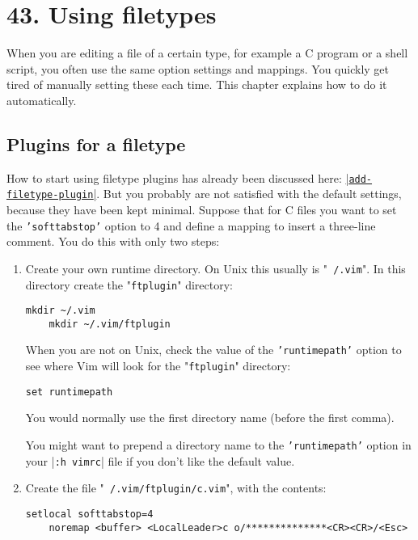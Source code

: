 \section{43. Using filetypes}
When you are editing a file of a certain type, for example a C program or a shell script, you often use the same option settings and mappings.
You quickly get tired of manually setting these each time.
This chapter explains how to do it automatically.
\subsection{Plugins for a filetype}            
\label{filetype-plugin}
How to start using filetype plugins has already been discussed here: \hyperref[add-filetype-plugin]{|\texttt{add-filetype-plugin}|}.
But you probably are not satisfied with the default settings, because they have been kept minimal.
Suppose that for C files you want to set the \texttt{'softtabstop'} option to 4 and define a mapping to insert a three-line comment.
You do this with only two steps:

\label{your-runtime-dir}
\begin{enumerate}
				\item Create your own runtime directory.
								On Unix this usually is "\texttt{~/.vim}".
								In this directory create the "\texttt{ftplugin}" directory:

								\begin{Verbatim}[samepage=true]
	mkdir ~/.vim
	mkdir ~/.vim/ftplugin
								\end{Verbatim}


								When you are not on Unix, check the value of the \texttt{'runtimepath'} option to see where Vim will look for the "\texttt{ftplugin}" directory:

								\begin{Verbatim}[samepage=true]
 set runtimepath
								\end{Verbatim}

								You would normally use the first directory name (before the first comma).

								You might want to prepend a directory name to the \texttt{'runtimepath'} option in your |\texttt{:h vimrc}| file if you don't like the default value.

				\item Create the file "\texttt{~/.vim/ftplugin/c.vim}", with the contents:
								\begin{Verbatim}[samepage=true]
	setlocal softtabstop=4
	noremap <buffer> <LocalLeader>c o/**************<CR><CR>/<Esc>
								\end{Verbatim}
\end{enumerate}

